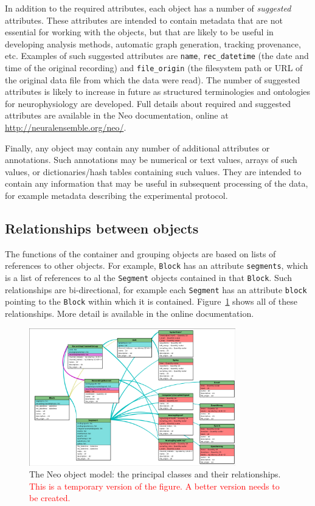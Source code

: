 \documentclass{frontiers}
\newcommand{\documentation}{\url{http://neuralensemble.org/neo/}}
\newcommand{\missing}[1]{\textcolor{red}{#1}}
\begin{document}
In addition to the required attributes, each object has a number of \emph{suggested} attributes.
These attributes are intended to contain metadata that are not essential for working with the objects, but that are likely to be useful in developing analysis methods, automatic graph generation, tracking provenance, etc.
Examples of such suggested attributes are \lstinline`name`, \lstinline`rec_datetime` (the date and time of the original recording) and \lstinline`file_origin` (the filesystem path or URL of the original data file from which the data were read).
The number of suggested attributes is likely to increase in future as structured terminologies and ontologies for neurophysiology are developed.
Full details about required and suggested attributes are available in the Neo documentation, online at \documentation.

Finally, any object may contain any number of additional attributes or annotations.
Such annotations may be numerical or text values, arrays of such values, or dictionaries/hash tables containing such values.
They are intended to contain any information that may be useful in subsequent processing of the data, for example metadata describing the experimental protocol.


\subsection{Relationships between objects}

The functions of the container and grouping objects are based on lists of references to other objects.
For example, \lstinline`Block` has an attribute \lstinline`segments`, which is a list of references to al the \lstinline`Segment` objects contained in that \lstinline`Block`.
Such relationships are bi-directional, for example each \lstinline`Segment` has an attribute \lstinline`block` pointing to the \lstinline`Block` within which it is contained.
Figure~\ref{fig:relationships} shows all of these relationships.
More detail is available in the online documentation.

\begin{figure}
\centering
\includegraphics[width=0.8\textwidth]{figures/simple_generated_diagram.png}
\caption{The Neo object model: the principal classes and their relationships. \missing{This is a temporary version of the figure. A better version needs to be created.}}\label{fig:relationships}
\end{figure}
\end{document}
